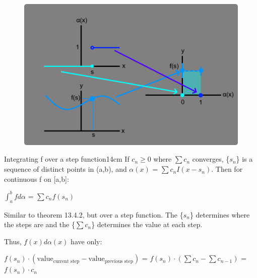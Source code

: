     \begin{figure}[h]
        \centering
        \includegraphics[scale=0.3]{Images/13.4.2.png}
    \end{figure}

    \newpage



    \begin{wtheorem}{Integrating f over a step function}{14cm}
        If $c_n \geq 0$ where $\sum c_n$ converges, \{$s_n$\} is a
        sequence of distinct points in (a,b), and
        $\alpha(x)$ = $\sum c_n I(x-s_n)$. Then for continuous f on [a,b]:

        \hspace{0.5cm}
        $\int_a^b f d\alpha$ = $\sum c_n f(s_n)$
    \end{wtheorem}

    \begin{intuition}
        Similar to {\color{red} theorem 13.4.2}, but over a step function.
        The \{$s_n$\} determines where the steps are and the \{$\sum c_n$\}
        determines the value at each step.

        Thus, $f(x) d\alpha(x)$ have only:

        \hspace{0.5cm}
        $f(s_n) \cdot (\text{value}_{\text{current step}}
                        - \text{value}_{\text{previous step}})$
        = $f(s_n) \cdot (\sum c_n - \sum c_{n-1})$
        = $f(s_n) \cdot c_n$
    \end{intuition}

    \vspace{0.1cm}
    
